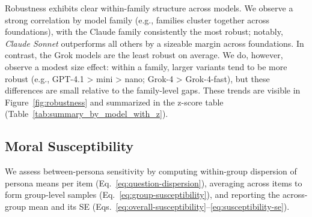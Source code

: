 \documentclass{article}
\begin{document}
Robustness exhibits clear within-family structure across models. We observe a strong correlation by model family (e.g., families cluster together across foundations), with the Claude family consistently the most robust; notably, \emph{Claude Sonnet} outperforms all others by a sizeable margin across foundations. In contrast, the Grok models are the least robust on average. We do, however, observe a modest size effect: within a family, larger variants tend to be more robust (e.g., GPT-4.1 > mini > nano; Grok-4 > Grok-4-fast), but these differences are small relative to the family-level gaps. These trends are visible in Figure~\ref{fig:robustness} and summarized in the z-score table (Table~\ref{tab:summary_by_model_with_z}).

\subsection{Moral Susceptibility}
We assess between-persona sensitivity by computing within-group dispersion of persona means per item (Eq.~\ref{eq:question-dispersion}), averaging across items to form group-level samples (Eq.~\ref{eq:group-susceptibility}), and reporting the across-group mean and its SE (Eqs.~\ref{eq:overall-susceptibility}--\ref{eq:susceptibility-se}).
\end{document}
